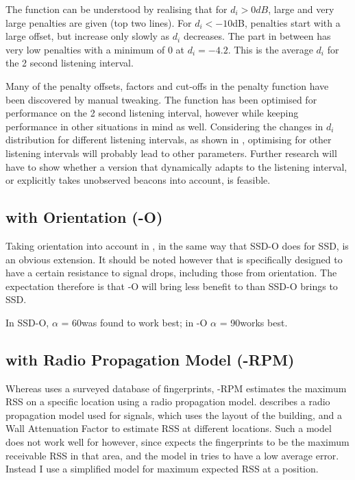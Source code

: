 The function can be understood by realising that for $d_i > 0dB$, large and very large penalties are given (top two lines).
For $d_i < -10$dB, penalties start with a large offset, but increase only slowly as $d_i$ decreases.
The part in between has very low penalties with a minimum of 0 at $d_i = -4.2$.
This is the average $d_i$ for the 2 second listening interval.

Many of the penalty offsets, factors and cut-offs in the \aBRP penalty function have been discovered by manual tweaking.
The function has been optimised for performance on the 2 second listening interval, however while keeping performance in other situations in mind as well.
Considering the changes in $d_i$ distribution for different listening intervals, as shown in , optimising for other listening intervals will probably lead to other parameters.
Further research will have to show whether a version that dynamically adapts to the listening interval, or explicitly takes unobserved beacons into account, is feasible.

\subsection{\BRP with Orientation (\aBRP-O)}
Taking orientation into account in \aBRP, in the same way that SSD-O does for SSD, is an obvious extension.
It should be noted however that \aBRP is specifically designed to have a certain resistance to signal drops, including those from orientation.
The expectation therefore is that \aBRP-O will bring less benefit to \aBRP than SSD-O brings to SSD.

In SSD-O, $\alpha$ = 60\textdegree was found to work best; in \aBRP-O $\alpha$ = 90\textdegree works best.

\subsection{\BRP with Radio Propagation Model (\aBRP-RPM)}
Whereas \aBRP uses a surveyed database of fingerprints, \aBRP-RPM estimates the maximum RSS on a specific location using a radio propagation model.
\citet{bahl2000radar} describes a radio propagation model used for \wifi signals, which uses the layout of the building, and a Wall Attenuation Factor to estimate RSS at different locations.
Such a model does not work well for \aBRP however, since \aBRP expects the fingerprints to be the maximum receivable RSS in that area, and the model in \citet{bahl2000radar} tries to have a low average error.
Instead I use a simplified model for maximum expected RSS at a position.

